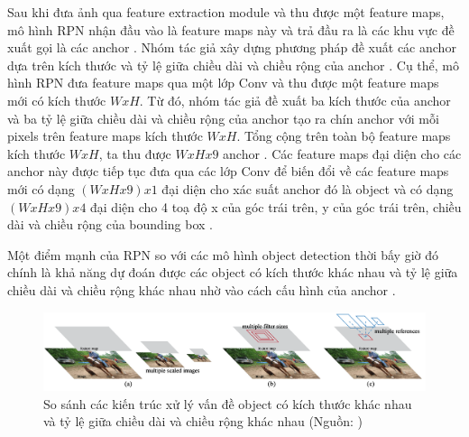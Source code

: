 {    \noindent
    Sau khi đưa ảnh qua feature extraction module  và thu được một feature maps, mô hình RPN nhận đầu vào là feature maps  này và trả đầu ra là các khu vực đề xuất gọi là các anchor .
    Nhóm tác giả xây dựng phương pháp đề xuất các anchor  dựa trên kích thước và tỷ lệ giữa chiều dài và chiều rộng của anchor .
    Cụ thể, mô hình RPN đưa feature maps  qua một lớp Conv  và thu được một feature maps  mới có kích thước $W x H$.
    Từ đó, nhóm tác giả đề xuất ba kích thước của anchor  và ba tỷ lệ giữa chiều dài và chiều rộng của anchor  tạo ra chín anchor  với mỗi pixels  trên feature maps  kích thước $W x H$.
    Tổng cộng trên toàn bộ feature maps  kích thước $W x H$, ta thu được $W x H x 9$ anchor .
    Các feature maps  đại diện cho các anchor  này được tiếp tục đưa qua các lớp Conv  để biến đổi về các feature maps  mới có dạng $(W x H x 9) x 1$ đại diện cho xác suất anchor  đó là object và có dạng $(W x H x 9) x 4$ đại diện cho 4 toạ độ x của góc trái trên, y của góc trái trên, chiều dài và chiều rộng của bounding box .

    \noindent
    Một điểm mạnh của RPN so với các mô hình object detection thời bấy giờ đó chính là khả năng dự đoán được các object có kích thước khác nhau và tỷ lệ giữa chiều dài và chiều rộng khác nhau nhờ vào cách cấu hình của anchor .

    \begin{figure}[H]
        \centering
        \includegraphics[width=15cm] {images/faster_rcnn_multi_scale_anchor}
        \caption{So sánh các kiến trúc xử lý vấn đề object có kích thước khác nhau và tỷ lệ giữa chiều dài và chiều rộng khác nhau (Nguồn: \cite{ren2015faster})}
        \label{fig:faster_rcnn_multi_scale_anchor}
    \end{figure}

}
